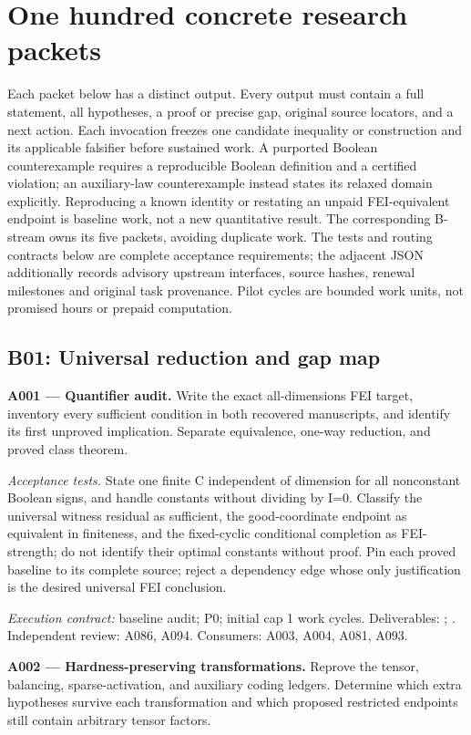 \documentclass[11pt]{article}
\begin{document}
\section{One hundred concrete research packets}

Each packet below has a distinct output. Every output must
contain a full statement, all hypotheses, a proof or precise gap,
original source locators, and a next action. Each invocation
freezes one candidate inequality or construction and its
applicable falsifier before sustained work. A purported Boolean
counterexample requires a reproducible Boolean definition and a
certified violation; an auxiliary-law counterexample instead
states its relaxed domain explicitly. Reproducing a known
identity or restating an unpaid FEI-equivalent endpoint is
baseline work, not a new quantitative result. The corresponding
B-stream owns its five packets, avoiding duplicate work. The tests and routing contracts below are complete acceptance requirements; the adjacent JSON additionally records advisory upstream interfaces, source hashes, renewal milestones and original task provenance. Pilot cycles are bounded work units, not promised hours or prepaid computation.
\subsection{B01: Universal reduction and gap map}

\textbf{A001 --- Quantifier audit.} Write the exact all-dimensions FEI target, inventory every sufficient condition in both recovered manuscripts, and identify its first unproved implication. Separate equivalence, one-way reduction, and proved class theorem.

\emph{Acceptance tests.} State one finite C independent of dimension for all nonconstant Boolean signs, and handle constants without dividing by I=0. Classify the universal witness residual as sufficient, the good-coordinate endpoint as equivalent in finiteness, and the fixed-cyclic conditional completion as FEI-strength; do not identify their optimal constants without proof. Pin each proved baseline to its complete source; reject a dependency edge whose only justification is the desired universal FEI conclusion.

{\small\emph{Execution contract:} baseline audit; P0; initial cap 1 work cycles. Deliverables: ; . Independent review: A086, A094. Consumers: A003, A004, A081, A093.}

\textbf{A002 --- Hardness-preserving transformations.} Reprove the tensor, balancing, sparse-activation, and auxiliary coding ledgers. Determine which extra hypotheses survive each transformation and which proposed restricted endpoints still contain arbitrary tensor factors.
\end{document}
